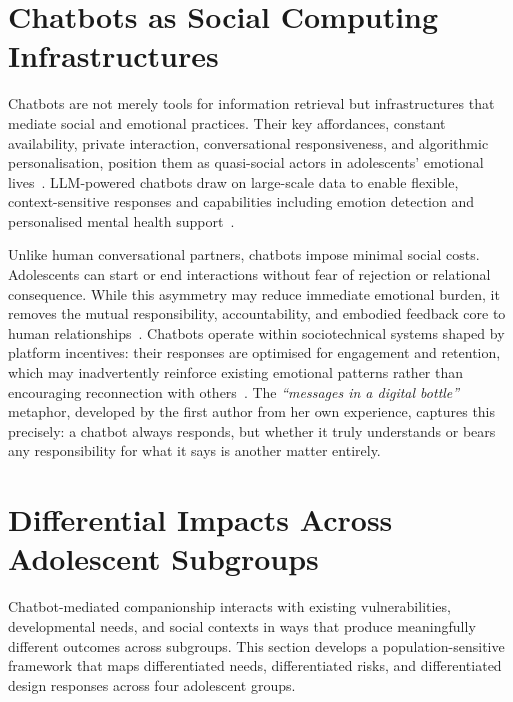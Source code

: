 \documentclass[manuscript]{acmart}
\begin{document}
\section{Chatbots as Social Computing Infrastructures}

Chatbots are not merely tools for information retrieval but infrastructures that mediate
social and emotional practices. Their key affordances, constant availability, private
interaction, conversational responsiveness, and algorithmic personalisation, position them
as quasi-social actors in adolescents' emotional lives~\cite{ReevesNass1996}. LLM-powered
chatbots draw on large-scale data to enable flexible, context-sensitive responses and
capabilities including emotion detection and personalised mental health
support~\cite{naveed2025comprehensive,jin2025applications}.

Unlike human conversational partners, chatbots impose minimal social costs. Adolescents can
start or end interactions without fear of rejection or relational consequence. While this
asymmetry may reduce immediate emotional burden, it removes the mutual responsibility,
accountability, and embodied feedback core to human
relationships~\cite{Turkle2011,ClarkBrennan1991}. Chatbots operate within sociotechnical
systems shaped by platform incentives: their responses are optimised for engagement and
retention, which may inadvertently reinforce existing emotional patterns rather than
encouraging reconnection with others~\cite{Bucher2018,Shneiderman2020}. The \textit{``messages in a digital bottle''} metaphor, developed by the first author from her
own experience, captures this precisely: a chatbot always responds, but whether it truly
understands or bears any responsibility for what it says is another matter entirely.


\section{Differential Impacts Across Adolescent Subgroups}

Chatbot-mediated companionship interacts with existing vulnerabilities, developmental needs,
and social contexts in ways that produce meaningfully different outcomes across subgroups.
This section develops a population-sensitive framework that maps differentiated
needs, differentiated risks, and differentiated design responses across four adolescent
groups.
\end{document}
